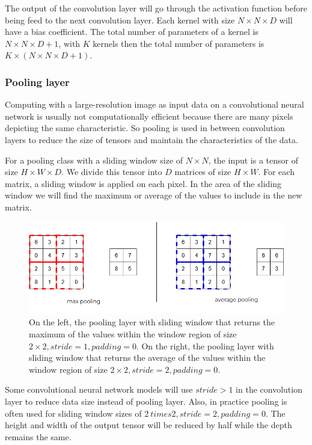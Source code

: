 \documentclass[conference]{IEEEtran}
\begin{document}
The output of the convolution layer will go through the activation function before being feed to the next convolution layer. Each kernel with size $ N \times N \times D $ will have a bias coefficient. The total number of parameters of a kernel is $ N \times N \times D + 1 $, with $ K $ kernels then the total number of parameters is $ K \times (N \times N \times D + 1) $.
\subsubsection{Pooling layer}
Computing with a large-resolution image as input data on a convolutional neural network is usually not computationally efficient because there are many pixels depicting the same characteristic. So pooling is used in between convolution layers to reduce the size of tensors and maintain the characteristics of the data.

For a pooling class with a sliding window size of $ N \times N $, the input is a tensor of size $ H \times W \times D $. We divide this tensor into $ D $ matrices of size $ H \times W $. For each matrix, a sliding window is applied on each pixel. In the area of the sliding window we will find the maximum or average of the values to include in the new matrix.
\begin{figure}[ht]
	\centerline{\includegraphics[scale=0.3]{images/pooling.png}}
  	\caption{On the left, the pooling layer with sliding window that returns the maximum of the values within the window region of size $ 2 \times 2, stride = 1, padding = 0 $. On the right, the pooling layer with sliding window that returns the average of the values within the window region of size $ 2 \times 2, stride = 2, padding = 0 $.}
  	\label{fig:pooling}
\end{figure}
Some convolutional neural network models will use $ stride> 1 $ in the convolution layer to reduce data size instead of pooling layer. Also, in practice pooling is often used for sliding window sizes of $ 2 \ times 2, stride = 2, padding = 0 $. The height and width of the output tensor will be reduced by half while the depth remains the same.
\end{document}
